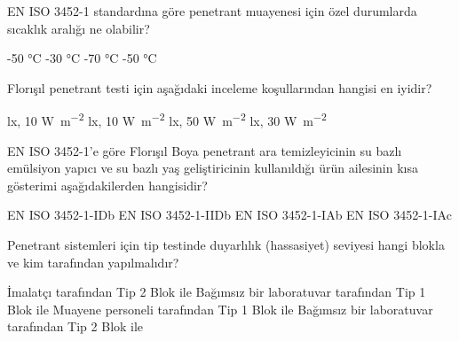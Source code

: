 \begin{question}[subtitle= EN ISO 3452-1]
	EN ISO 3452-1 standardına göre penetrant muayenesi için özel durumlarda sıcaklık aralığı ne
olabilir?
	\begin{tasks}
		-50 \si{\degreeCelsius} \correct
		-30 \si{\degreeCelsius} 
		-70 \si{\degreeCelsius}  
		-50 \si{\degreeCelsius}
	\end{tasks}
\end{question}
\begin{solution}
	\correct
\end{solution}

\begin{question}[subtitle= EN ISO 3452-1]
	Florışıl penetrant testi için aşağıdaki inceleme koşullarından hangisi en iyidir?
	\begin{tasks}
		 lx, 10 \si{\watt\per\m^{2}}
		 lx, 10 \si{\watt\per\m^{2}}
		 lx, 50 \si{\watt\per\m^{2}} \correct
		 lx, 30 \si{\watt\per\m^{2}}
	\end{tasks}
\end{question}
\begin{solution}
	\correct
\end{solution}

\begin{question}[subtitle= EN ISO 3452-1]
EN ISO 3452-1'e göre Florışıl Boya penetrant ara temizleyicinin su bazlı emülsiyon yapıcı ve su bazlı
yaş geliştiricinin kullanıldığı ürün ailesinin kısa gösterimi aşağıdakilerden hangisidir?
	\begin{tasks}
		\task EN ISO 3452-1-IDb \correct
		\task EN ISO 3452-1-IIDb
		\task EN ISO 3452-1-IAb
		\task EN ISO 3452-1-IAc 
	\end{tasks}
\end{question}
\begin{solution}
	\correct
\end{solution}


\begin{question}[subtitle= EN ISO 3452-2]
  Penetrant sistemleri için tip testinde duyarlılık (hassasiyet) seviyesi hangi blokla ve kim tarafından
yapılmalıdır?
	\begin{tasks}
		\task İmalatçı tarafından Tip 2 Blok ile
		\task Bağımsız bir laboratuvar tarafından Tip 1 Blok ile \correct
		\task Muayene personeli tarafından Tip 1 Blok ile
		\task Bağımsız bir laboratuvar tarafından Tip 2 Blok ile
	\end{tasks}
\end{question}
\begin{solution}
	\correct
\end{solution}

